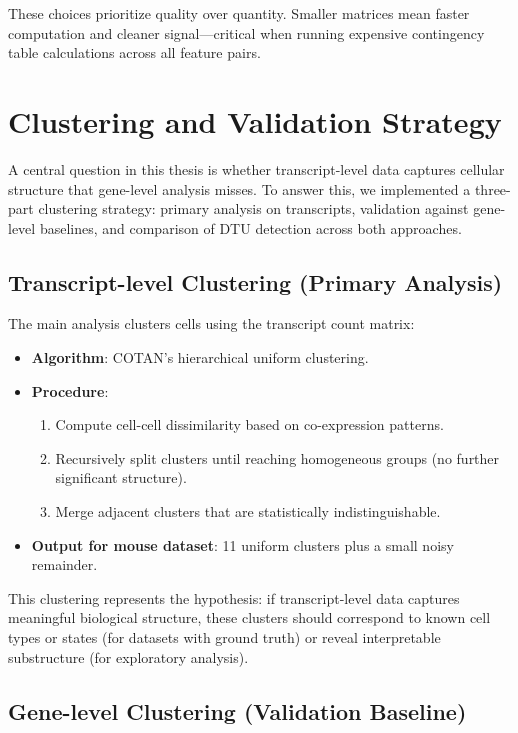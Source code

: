 These choices prioritize quality over quantity. Smaller matrices mean faster computation and cleaner signal---critical when running expensive contingency table calculations across all feature pairs.

\section{Clustering and Validation Strategy}

A central question in this thesis is whether transcript-level data captures cellular structure that gene-level analysis misses. To answer this, we implemented a three-part clustering strategy: primary analysis on transcripts, validation against gene-level baselines, and comparison of DTU detection across both approaches.

\subsection*{Transcript-level Clustering (Primary Analysis)}

The main analysis clusters cells using the transcript count matrix:

\begin{itemize}
    \item \textbf{Algorithm}: COTAN's hierarchical uniform clustering.
    \item \textbf{Procedure}:
    \begin{enumerate}
        \item Compute cell-cell dissimilarity based on co-expression patterns.
        \item Recursively split clusters until reaching homogeneous groups (no further significant structure).
        \item Merge adjacent clusters that are statistically indistinguishable.
    \end{enumerate}
    \item \textbf{Output for mouse dataset}: 11 uniform clusters plus a small noisy remainder.
\end{itemize}

This clustering represents the hypothesis: if transcript-level data captures meaningful biological structure, these clusters should correspond to known cell types or states (for datasets with ground truth) or reveal interpretable substructure (for exploratory analysis).

\subsection*{Gene-level Clustering (Validation Baseline)}

